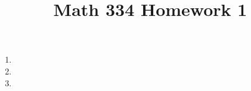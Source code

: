 \documentclass{article}
\title{Math 334 Homework 1}
\begin{document}
    \maketitle
    \begin{enumerate}
      \item 
      \item 
      \item 
    \end{enumerate}
\end{document}
